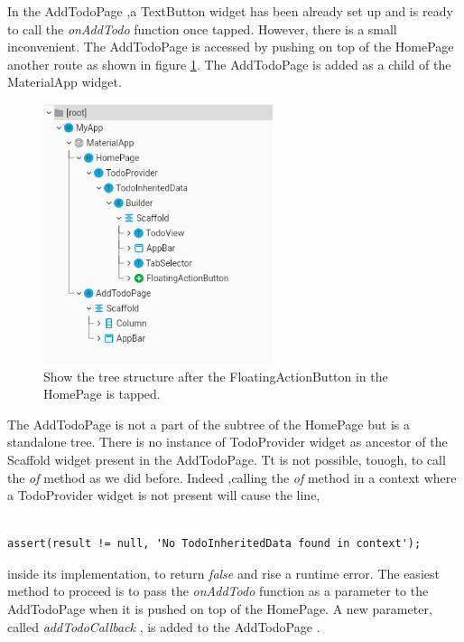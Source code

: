 In the AddTodoPage ,a TextButton widget has been already set up and is ready to call the \textit{onAddTodo }function once tapped. However, there is a small inconvenient. The AddTodoPage is accessed by pushing on top of the HomePage another route as shown in figure \ref{fig:add_todo_page_tree_structure}. The AddTodoPage is added as a child of the MaterialApp widget.

\begin{figure}[H]
    \centering
    \includegraphics[width=0.6\textwidth]{Images/tree_structure_on_AddTodoPage.png}
    \caption{Show the tree structure after the FloatingActionButton in the HomePage is tapped.}
    \label{fig:add_todo_page_tree_structure}
\end{figure}


The AddTodoPage is not a part of the subtree of the HomePage but is a standalone tree. There is no instance of TodoProvider widget as ancestor of the  Scaffold widget present in the AddTodoPage. Tt is not possible, touogh, to call the \textit{of} method as  we did before. Indeed ,calling the \textit{of} method in a context where a TodoProvider widget is not present will cause the line,
\mbox{}\\

\begin{code}
\begin{verbatim}

assert(result != null, 'No TodoInheritedData found in context');
\end{verbatim}
\end{code}
inside its implementation, to return \textit{false} and rise a runtime error. The easiest method to proceed is to pass the \textit{onAddTodo} function as a parameter to the AddTodoPage when it is pushed on top of the HomePage. A new parameter, called \textit{addTodoCallback }, is added to the AddTodoPage .
\mbox{}\\


